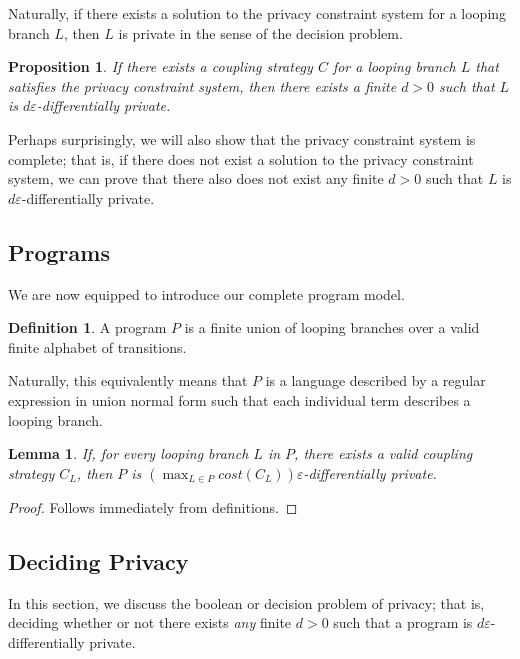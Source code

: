 \documentclass[12pt]{article}
\newtheorem{lemma}[thm]{Lemma}
\newtheorem{prop}[thm]{Proposition}
\theoremstyle{definition}
\newtheorem{defn}[thm]{Definition}
\begin{document}
Naturally, if there exists a solution to the privacy constraint system for a looping branch $L$, then $L$ is private in the sense of the decision problem. 

\begin{prop}\label{privacyFiniteCostProp}
    If there exists a coupling strategy $C$ for a looping branch $L$ that satisfies the privacy constraint system, then there exists a finite $d>0$ such that $L$ is $d\varepsilon$-differentially private. 
\end{prop}

Perhaps surprisingly, we will also show that the privacy constraint system is complete; that is, if there does not exist a solution to the privacy constraint system, we can prove that there also does not exist any finite $d>0$ such that $L$ is $d\varepsilon$-differentially private. 

\subsection{Programs}

We are now equipped to introduce our complete program model. 

\begin{defn}
    A program $P$ is a finite union of looping branches over a valid finite alphabet of transitions. 
\end{defn}

Naturally, this equivalently means that $P$ is a language described by a regular expression in union normal form such that each individual term describes a looping branch. 

\begin{lemma}
    If, for every looping branch $L$ in $P$, there exists a valid coupling strategy $C_L$, then $P$ is $(\max_{L\in P} cost(C_L))\varepsilon$-differentially private. 
\end{lemma}
\begin{proof}
    Follows immediately from definitions. 
\end{proof}

\subsection{Deciding Privacy}

In this section, we discuss the boolean or decision problem of privacy; that is, deciding whether or not there exists \textit{any} finite $d>0$ such that a program is $d\varepsilon$-differentially private. 
\end{document}
